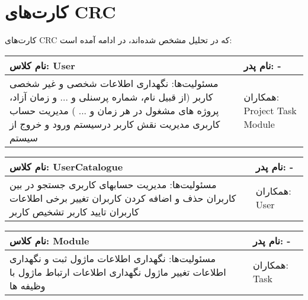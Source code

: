 \newpage
\section{کارت‌های CRC}

کارت‌های CRC که در تحلیل مشخص شده‌اند، در ادامه آمده است:

\vspace{1cm}
\begin{tabular}{|p{6cm}|p{6cm}|}
\hline
نام کلاس: User
&
نام پدر: -
\\
\hline
مسئولیت‌ها:
\newline
نگهداری اطلاعات شخصی و غیر شخصی کاربر (از قبیل نام، شماره پرسنلی و ... و زمان آزاد، پروژه های مشغول در هر زمان و ... )
\newline
مدیریت حساب کاربری
\newline
مدیریت نقش کاربر درسیستم
\newline
ورود و خروج از سیستم
&
همکاران:
\newline
Project
\newline
Task
\newline
Module
\\
\hline
\end{tabular}

\vspace{1cm}
\begin{tabular}{|p{6cm}|p{6cm}|}
\hline
نام کلاس: UserCatalogue
&
نام پدر: -
\\
\hline
مسئولیت‌ها:
\newline
مدیریت حسابهای کاربری
\newline
جستجو در بین کاربران
\newline
حذف و اضافه کردن کاربران
\newline
تغییر برخی اطلاعات کاربران
\newline
تایید کاربر
\newline
تشخیص کاربر
&
همکاران:
\newline
User
\\
\hline
\end{tabular}
\vspace{1cm}

\begin{tabular}{|p{6cm}|p{6cm}|}
\hline
نام کلاس: Module
&
نام پدر: -
\\
\hline
مسئولیت‌ها:
\newline
نگهداری اطلاعات ماژول
\newline
ثبت و نگهداری اطلاعات تغییر ماژول
\newline
نگهداری اطلاعات ارتباط ماژول با وظیفه ها
&
همکاران:
\newline
Task
\\
\hline
\end{tabular}
\vspace{1cm}

